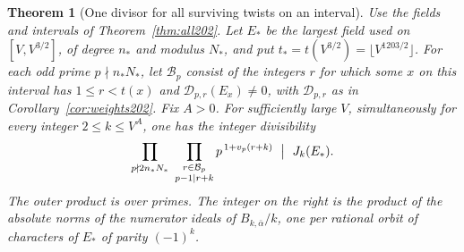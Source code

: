\documentclass[a4paper,11pt]{article}
\newtheorem{theorem}[proposition]{Theorem}
\theoremstyle{definition}
\theoremstyle{remark}
\numberwithin{equation}{section}
\begin{document}
\begin{theorem}[One divisor for all surviving twists on an interval]
\label{thm:shareddiv230}
Use the fields and intervals of Theorem~\ref{thm:all202}. Let
\(E_*\) be the largest field used on \([V,V^{3/2}]\), of degree
\(n_*\) and modulus \(N_*\), and put
\(t_*=t(V^{3/2})=\lfloor V^{1203/2}\rfloor\).
For each odd prime \(p\nmid n_*N_*\), let \(\mathcal B_p\)
consist of the integers \(r\) for which some \(x\) on this
interval has \(1\le r<t(x)\) and \(\mathcal D_{p,r}(E_x)\ne0\),
with \(\mathcal D_{p,r}\) as in Corollary~\ref{cor:weights202}.
Fix \(A>0\). For sufficiently large \(V\), simultaneously for
every integer \(2\le k\le V^A\), one has the integer divisibility
\[
 \prod_{p\nmid 2n_*N_*}
 \ \prod_{\substack{r\in\mathcal B_p\\p-1\mid r+k}}
       p^{\,1+v_p(r+k)}\ \bigm|\ J_k(E_*).
\]
The outer product is over primes. The integer on the right is
the product of the absolute norms of the numerator ideals of
\(B_{k,\bar\alpha}/k\), one per rational orbit of characters
of \(E_*\) of parity \((-1)^k\).
\end{theorem}
\end{document}
